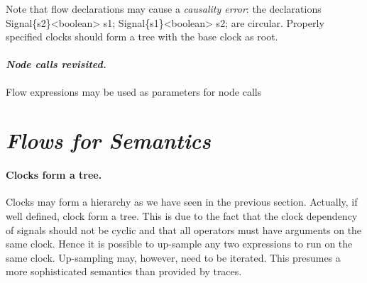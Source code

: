 {Note that flow declarations may cause a \emph{causality error}: the declarations
\BEP
Signal\{s2\}<boolean> s1;
Signal\{s1\}<boolean> s2;
\EEP
are circular. Properly specified clocks 
should form a tree with the base clock as root.

\paragraph{\textit{Node calls revisited.}} Flow expressions may be used as parameters for node calls


\section{\textit{Flows for Semantics}}\label{flows}

\paragraph{Clocks form a tree.}
Clocks may form a hierarchy as we have seen in the previous section.
Actually, if well defined, clock form a tree. This is due to the fact that
the clock dependency of signals should not be cyclic and that all operators 
must have arguments on the same clock. Hence it is possible to up-sample any
two expressions to run on the same clock. Up-sampling may, however, need to 
be iterated. This presumes a more sophisticated semantics than provided by 
traces.


}
